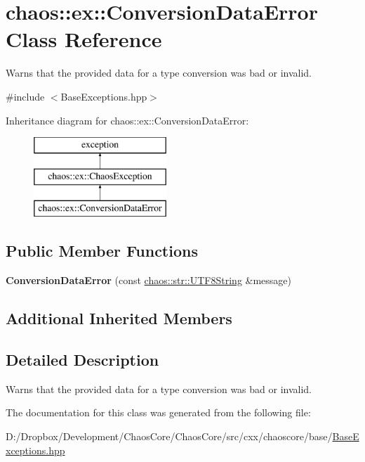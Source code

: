 \hypertarget{classchaos_1_1ex_1_1_conversion_data_error}{}\section{chaos\+:\+:ex\+:\+:Conversion\+Data\+Error Class Reference}
\label{classchaos_1_1ex_1_1_conversion_data_error}


Warns that the provided data for a type conversion was bad or invalid.  




{\ttfamily \#include $<$Base\+Exceptions.\+hpp$>$}

Inheritance diagram for chaos\+:\+:ex\+:\+:Conversion\+Data\+Error\+:\begin{figure}[H]
\begin{center}
\leavevmode
\includegraphics[height=3.000000cm]{classchaos_1_1ex_1_1_conversion_data_error}
\end{center}
\end{figure}
\subsection*{Public Member Functions}
\begin{DoxyCompactItemize}
\item 
\hypertarget{classchaos_1_1ex_1_1_conversion_data_error_afef7fd90707b2bd0be147090613c1222}{}{\bfseries Conversion\+Data\+Error} (const \hyperlink{classchaos_1_1str_1_1_u_t_f8_string}{chaos\+::str\+::\+U\+T\+F8\+String} \&message)\label{classchaos_1_1ex_1_1_conversion_data_error_afef7fd90707b2bd0be147090613c1222}

\end{DoxyCompactItemize}
\subsection*{Additional Inherited Members}


\subsection{Detailed Description}
Warns that the provided data for a type conversion was bad or invalid. 

The documentation for this class was generated from the following file\+:\begin{DoxyCompactItemize}
\item 
D\+:/\+Dropbox/\+Development/\+Chaos\+Core/\+Chaos\+Core/src/cxx/chaoscore/base/\hyperlink{_base_exceptions_8hpp}{Base\+Exceptions.\+hpp}\end{DoxyCompactItemize}

